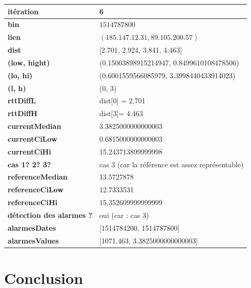 \begin{table}[H]
	\centering
	
	\begin{tabularx}{\linewidth}{|l|X| }
		\hline
		\textbf{itération} & 6	\\ \hline
		\textbf{bin} & $1514787800$ \\ \hline
		\textbf{lien} & $(185.147.12.31, 89.105.200.57)$  \\ \hline
		\textbf{dist}& [2.701, 2.924, 3.841, 4.463]	\\ \hline
		\textbf{(low, hight)}& (0.15003898915214947, 0.8499610108478506) 	\\ \hline
		\textbf{(lo, hi)}&(0.6001559566085979, 3.3998440433914023)  \\ \hline
		\textbf{(l, h)} & (0, 3) 	\\ \hline
		\textbf{rttDiffL}& dist[0] = 2.701	\\ \hline
		\textbf{rttDiffH}& dist[3]= 4.463	\\ \hline
		\textbf{currentMedian}&  3.3825000000000003	\\ \hline
		\textbf{currentCiLow}& 0.6815000000000003 	\\ \hline
		\textbf{currentCiHi}& 15.243713899999998	\\ \hline
		\textbf{cas 1? 2? 3?}& cas 3 (car la référence est assez représentable)  \\ \hline
		\textbf{referenceMedian}& 13.5727878 	\\ \hline
		\textbf{referenceCiLow}&  12.7333531	\\ \hline
		\textbf{referenceCiHi}& 15.352609999999999 	\\ \hline
		\textbf{détection des alarmes ?}& oui (car : cas 3)	\\ \hline
		\textbf{alarmesDates}& [1514784200, 1514787800]	\\ \hline
		\textbf{alarmesValues}& [1071.463, 3.3825000000000003]	\\ \hline
	\end{tabularx}
\end{table}

\section{Conclusion}